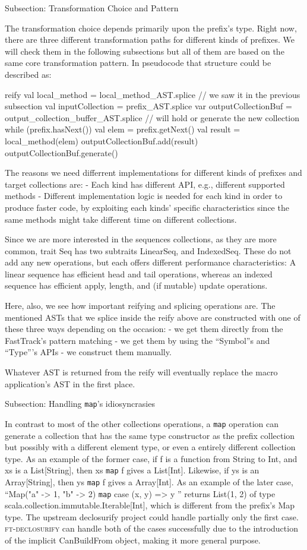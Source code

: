Subsection: Transformation Choice and Pattern

The transformation choice depends primarily upon the prefix's type. Right now,
there are three different transformation paths for different kinds of
prefixes. We will check them in the following subsections but all of them are
based on the same core transformation pattern. In pseudocode that structure
could be described as:

reify {
  val local\_method = local\_method\_AST.splice // we saw it in the previous
subsection
  val inputCollection = prefix\_AST.splice
  var outputCollectionBuf = output\_collection\_buffer\_AST.splice // will
hold or generate the new collection
  while (prefix.hasNext()) {
    val elem = prefix.getNext()
    val result = local\_method(elem)
    outputCollectionBuf.add(result)
  }
  outputCollectionBuf.generate()
}

The reasons we need differrent implementations for different kinds of
prefixes and target collections are:
- Each kind has different API, e.g., different supported methods
- Different implementation logic is needed for each kind in order to produce
faster code, by exploiting each kinds' specific characteristics since the same
methods might take different time on different collections.

Since we are more interested in the sequences collections, as they are more
common, trait Seq has two subtraits LinearSeq, and IndexedSeq. These do not add
any new operations, but each offers different performance characteristics: A
linear sequence has efficient head and tail operations, whereas an indexed
sequence has efficient apply, length, and (if mutable) update operations. 

Here, also, we see how important reifying and splicing operations are. The
mentioned ASTs that we splice inside the reify above are constructed with one of
these three ways depending on the occasion:
- we get them directly from the FastTrack's pattern matching
- we get them by using the ``Symbol''s and ``Type'''s APIs
- we construct them manually.

Whatever AST is returned from the reify will eventually replace the macro
application's AST in the first place.


Subsection: Handling \texttt{map}'s idiosyncrasies

In contrast to most of the other collections operations, a \texttt{map} operation can
generate a collection that has the same type constructor as the prefix
collection but possibly with a different element type, or even a entirely
different collection type. As an example of the former case, if f is a function
from String to Int, and xs is a List[String], then xs \texttt{map} f gives a List[Int].
Likewise, if ys is an Array[String], then ys \texttt{map} f gives a Array[Int]. As an
example of the later case,   ``Map("a" -> 1, "b" -> 2) \texttt{map} { case (x, y) => y
}'' returns List(1, 2) of type scala.collection.immutable.Iterable[Int],
which is different from the prefix's Map type. The upstream declosurify project
could handle partially only the first case. \textsc{ft-declosurify} can handle both of
the cases successfully due to the introduction of the implicit CanBuildFrom
object, making it more general purpose.


